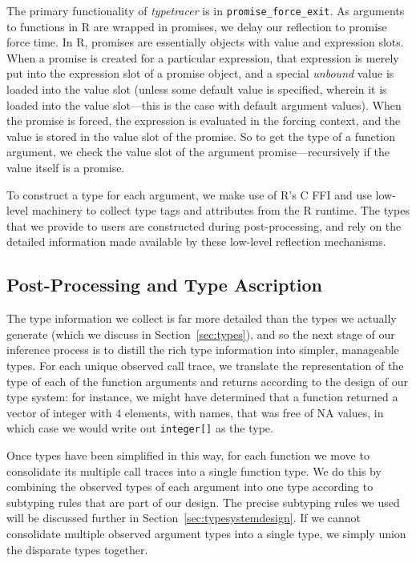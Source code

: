 \documentclass[acmsmall,review,anonymous]{acmart}\settopmatter{printfolios=true,printccs=false,printacmref=false}
\newcommand{\code}[1]{{\lstinline[style=Rin]!#1!}\xspace}
\newcommand{\typetracer}{\emph{typetracer}\xspace} %
\begin{document}
The primary functionality of \typetracer is in {\tt promise\_force\_exit}.  As arguments to
functions in R are wrapped in promises, we delay our reflection to promise
force time.  In R, promises are essentially objects with value and
expression slots.  When a promise is created for a particular expression,
that expression is merely put into the expression slot of a promise object,
and a special {\it unbound} value is loaded into the value slot (unless some
default value is specified, wherein it is loaded into the value slot---this
is the case with default argument values).  When the promise is forced, the
expression is evaluated in the forcing context, and the value is stored in
the value slot of the promise.  So to get the type of a function argument,
we check the value slot of the argument promise---recursively if the
value itself is a promise.

To construct a type for each argument, we make use of R's C FFI and use
low-level machinery to collect type tags and attributes from the R runtime.
The types that we provide to users are constructed during post-processing,
and rely on the detailed information made available by these low-level
reflection mechanisms.

%
%
%
%
\subsection{Post-Processing and Type Ascription}


The type information we collect is far more detailed than the types we
actually generate (which we discuss in Section~\ref{sec:types}), and so the next stage of our inference process is to
distill the rich type information into simpler, manageable types.  For each
unique observed call trace, we translate the representation of the type of
each of the function arguments and returns according to the design of our
type system: for instance, we might have determined that a function returned
a vector of integer with 4 elements, with names, that was free of NA values,
in which case we would write out \code{integer[]} as the type.

Once types have been simplified in this way, for each function we move to
consolidate its multiple call traces into a single function type.  We do
this by combining the observed types of each argument into one type according to subtyping rules that are part of our
design.  The precise subtyping rules we used will be discussed further in
Section~\ref{sec:typesystemdesign}.
If we cannot consolidate multiple observed argument types into a single type, we simply union the disparate types together.
\end{document}
